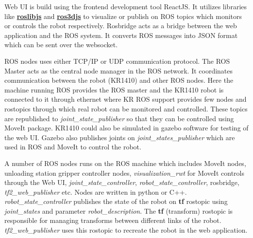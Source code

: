 Web UI is build using the frontend development tool ReactJS. It utilizes libraries like \hyperref[par:roslibjs]{\textbf{roslibjs}} and \hyperref[par:ros3djs]{\textbf{ros3djs}} to visualize or publish on ROS topics which monitors or controls the robot respectively. Rosbridge acts as a bridge between the web application and the ROS system. It converts ROS messages into JSON format which can be sent over the websocket.

ROS nodes uses either TCP/IP or UDP communication protocol. 
The ROS Master acts as the central node manager in the ROS network. It coordinates communication between the robot (KR1410) and other ROS nodes.
Here the machine running ROS provides the ROS master \cite{rosmaster} and the KR1410 robot is connected to it through ethernet where KR ROS support provides few nodes and rostopics through which real robot can be monitored and controlled. These topics are republished to \textit{joint\_state\_publisher} so that they can be controlled using MoveIt package.
KR1410 could also be simulated in gazebo software for testing of the web UI. Gazebo also publishes joints on \textit{joint\_states\_publisher} which are used in ROS and MoveIt to control the robot.

A number of ROS nodes runs on the ROS machine which includes MoveIt nodes, unloading station gripper controller nodes, \textit{visualization\_rwt} for MoveIt controls through the Web UI, \textit{joint\_state\_controller}, \textit{robot\_state\_controller}, rosbridge, \textit{tf2\_web\_publisher} etc. Nodes are written in python or C++. \textit{robot\_state\_controller} publishes the state of the robot on \textbf{tf} rostopic using \textit{joint\_states} and parameter \textit{robot\_description}. The \textbf{tf} (transform) rostopic is responsible for managing transforms between different links of the robot. \textit{tf2\_web\_publisher} uses this rostopic to recreate the robot in the web application.

